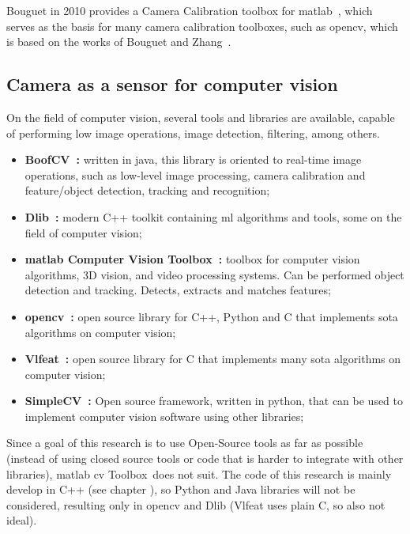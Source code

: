 Bouguet in 2010 provides a Camera Calibration toolbox for \ac{matlab}~\cite{Bouguet2010}, which serves as the basis for many camera calibration toolboxes, such as \ac{opencv}, which is based on the works of Bouguet and Zhang~\cite{opencv}.


\subsection{Camera as a sensor for computer vision}
On the field of computer vision, several tools and libraries are available, capable of performing low image operations, image detection, filtering, among others. 

\begin{itemize}
	\item \textbf{BoofCV~\cite{boofcv}:} written in java, this library is oriented to real-time image operations, such as low-level image processing, camera calibration and feature/object  detection, tracking and recognition;
	\item \textbf{Dlib~\cite{dlib}:} modern C++ toolkit containing \acl{ml} algorithms and tools, some on the field of computer vision;
	\item \textbf{\ac{matlab} Computer Vision Toolbox\texttrademark~\cite{matlabcvtoolbox}:} toolbox for computer vision algorithms, 3D vision, and video processing systems. Can be performed object detection and tracking. Detects, extracts and matches features;
	\item \textbf{\acf{opencv}~\cite{opencv}:} open source library for C++, Python and C that implements \acl{sota} algorithms on computer vision;
	\item \textbf{Vlfeat~\cite{vlfeat}:} open source library for C that implements many \acl{sota} algorithms on computer vision;
	\item \textbf{SimpleCV~\cite{simplecv}:} Open source framework, written in python, that can be used to implement computer vision software using other libraries;
\end{itemize}

Since a goal of this research is to use Open-Source tools as far as possible (instead of using closed source tools or code that is harder to integrate with other libraries), \ac{matlab} \acl{cv} Toolbox\texttrademark~does not suit. The code of this research is mainly develop in C++ (see chapter \citeneeded), so Python and Java libraries will not be considered, resulting only in \ac{opencv} and Dlib (Vlfeat uses plain C, so also not ideal). 

